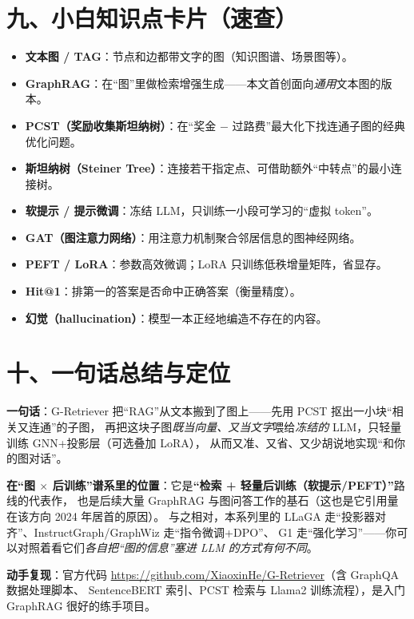 \documentclass[11pt,UTF8,fontset=fandol]{ctexart}
\begin{document}
\section{九、小白知识点卡片（速查）}
\begin{itemize}[leftmargin=2em]
  \item \textbf{文本图 / TAG}：节点和边都带文字的图（知识图谱、场景图等）。
  \item \textbf{GraphRAG}：在“图”里做检索增强生成——本文首创面向\emph{通用}文本图的版本。
  \item \textbf{PCST（奖励收集斯坦纳树）}：在“奖金 $-$ 过路费”最大化下找连通子图的经典优化问题。
  \item \textbf{斯坦纳树（Steiner Tree）}：连接若干指定点、可借助额外“中转点”的最小连接树。
  \item \textbf{软提示 / 提示微调}：冻结 LLM，只训练一小段可学习的“虚拟 token”。
  \item \textbf{GAT（图注意力网络）}：用注意力机制聚合邻居信息的图神经网络。
  \item \textbf{PEFT / LoRA}：参数高效微调；LoRA 只训练低秩增量矩阵，省显存。
  \item \textbf{Hit@1}：排第一的答案是否命中正确答案（衡量精度）。
  \item \textbf{幻觉（hallucination）}：模型一本正经地编造不存在的内容。
\end{itemize}

\section{十、一句话总结与定位}

\textbf{一句话}：G-Retriever 把“RAG”从文本搬到了图上——先用 PCST 抠出一小块“相关又连通”的子图，
再把这块子图\emph{既当向量、又当文字}喂给\emph{冻结的} LLM，只轻量训练 GNN+投影层（可选叠加 LoRA），
从而又准、又省、又少胡说地实现“和你的图对话”。

\textbf{在“图 $\times$ 后训练”谱系里的位置}：它是\textbf{“检索 + 轻量后训练（软提示/PEFT）”}路线的代表作，
也是后续大量 GraphRAG 与图问答工作的基石（这也是它引用量在该方向 2024 年居首的原因）。
与之相对，本系列里的 LLaGA 走“投影器对齐”、InstructGraph/GraphWiz 走“指令微调+DPO”、
G1 走“强化学习”——你可以对照着看它们\emph{各自把“图的信息”塞进 LLM 的方式有何不同}。

\textbf{动手复现}：官方代码 \url{https://github.com/XiaoxinHe/G-Retriever}（含 GraphQA 数据处理脚本、
SentenceBERT 索引、PCST 检索与 Llama2 训练流程），是入门 GraphRAG 很好的练手项目。
\end{document}
